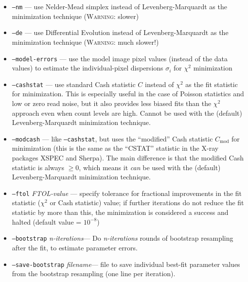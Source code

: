 \documentclass[10pt,a4paper,article]{memoir}
\newcommand{\chisquare}{\ensuremath{\chi^{2}}}
\begin{document}
\begin{itemize}
\bigskip

\item \texttt{--nm} --- use Nelder-Mead simplex instead of Levenberg-Marquardt as
the minimization technique (\textsc{Warning}: slower)
\item \texttt{--de} --- use Differential Evolution instead of Levenberg-Marquardt as
the minimization technique (\textsc{Warning}: much slower!)

\bigskip

\item \texttt{--model-errors} --- use the model image pixel values
(instead of the data values) to estimate the individual-pixel dispersions
$\sigma_{i}$ for \chisquare{} minimization

\item \texttt{--cashstat} --- use standard Cash statistic $C$ instead of \chisquare{}
as the fit statistic for minimization. This is especially useful in the
case of Poisson statistics and low or zero read noise, but it also provides less
biased fits than the \chisquare{} approach even when count levels are
high. Cannot be used with the (default) Levenberg-Marquardt minimization
technique.

\item \texttt{--modcash} --- like \texttt{--cashstat}, but uses the
``modified'' Cash statistic $C_{\mathrm{mod}}$ for minimization (this is
the same as the ``CSTAT'' statistic in the X-ray packages XSPEC and
Sherpa). The main difference is that the modified Cash statistic is
always $\ge 0$, which means it \textit{can} be used with the (default)
Levenberg-Marquardt minimization technique.

\item \texttt{--ftol} \textit{FTOL-value} --- specify tolerance for
fractional improvements in the fit statistic (\chisquare{} or Cash
statistic) value; if further iterations do not reduce the fit statistic
by more than this, the minimization is considered a success and halted 
(default value = $10^{-8}$)

\bigskip

\item \texttt{--bootstrap} \textit{n-iterations}--- Do \textit{n-iterations} rounds
of bootstrap resampling after the fit, to estimate parameter errors.

\item \texttt{--save-bootstrap} \textit{filename}--- file to save
individual best-fit parameter values from the bootstrap resampling (one
line per iteration).


\end{itemize}
\end{document}
